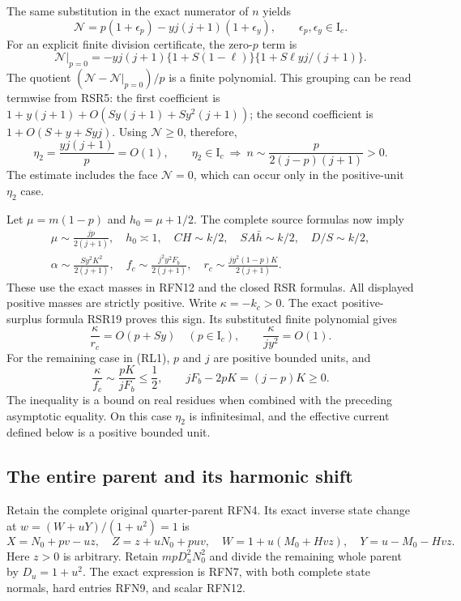 The same substitution in the exact numerator of \(n\) yields
\[
 \mathcal N=p(1+\epsilon_p)
                -yj(j+1)(1+\epsilon_y),\qquad
 \epsilon_p,\epsilon_y\in\mathrm I_c.                  \tag{RL5}
\]
For an explicit finite division certificate, the zero-\(p\) term is
\[
 \mathcal N|_{p=0}
 =-yj(j+1)\{1+S(1-\ell)\}
             \{1+S\ell yj/(j+1)\}.
\]
The quotient \((\mathcal N-\mathcal N|_{p=0})/p\) is a
finite polynomial.  This grouping can be read termwise from RSR5:
the first
coefficient is \(1+y(j+1)+O(Sy(j+1)+Sy^2(j+1))\);
the second coefficient is \(1+O(S+y+Syj)\).
Using \(\mathcal N\geq0\), therefore,
\[
 \eta_2=\frac{yj(j+1)}p=O(1),\qquad
 \eta_2\in\mathrm I_c\ \Longrightarrow\
 n\sim\frac{p}{2(j-p)(j+1)}>0 .                        \tag{RL6}
\]
The estimate includes the face \(\mathcal N=0\), which can occur
only in the positive-unit \(\eta_2\) case.

Let \(\mu=m(1-p)\) and \(h_0=\mu+1/2\).
The complete source formulas now imply
\[
\begin{gathered}
 \mu\sim\frac{jp}{2(j+1)},\quad h_0\asymp1,\quad
 CH\sim k/2,\quad SA\bar h\sim k/2,\quad D/S\sim k/2,\\
 \alpha\sim\frac{Sy^2K^2}{2(j+1)},\quad
 f_c\sim\frac{j^2y^2F_b}{2(j+1)},\quad
 r_c\sim\frac{jy^2(1-p)K}{2(j+1)} .
\end{gathered}                                                   \tag{RL7}
\]
These use the exact masses in RFN12 and the closed RSR formulas.
All displayed positive masses are strictly positive.
Write \(\kappa=-k_c>0\).  The exact positive-surplus formula
RSR19 proves this sign.  Its substituted finite polynomial gives
\[
 \frac{\kappa}{r_c}=O(p+Sy)\quad(p\in\mathrm I_c),\qquad
 \frac{\kappa}{jy^2}=O(1).                              \tag{RL8}
\]
For the remaining case in (RL1), \(p\) and \(j\) are positive
bounded units, and
\[
 \frac{\kappa}{f_c}\sim\frac{pK}{jF_b}\leq\frac12,
 \qquad jF_b-2pK=(j-p)K\geq0.                          \tag{RL9}
\]
The inequality is a bound on real residues when combined with
the preceding asymptotic equality.  On this case \(\eta_2\) is
infinitesimal, and the effective current defined below is a
positive bounded unit.

\subsection{The entire parent and its harmonic shift}

Retain the complete original quarter-parent RFN4.  Its exact inverse
state change at \(w=(W+uY)/(1+u^2)=1\) is
\[
 X=N_0+pv-uz,\quad Z=z+uN_0+puv,\quad
 W=1+u(M_0+Hvz),\quad Y=u-M_0-Hvz.                    \tag{RL10}
\]
Here \(z>0\) is arbitrary.  Retain \(mpD_u^2N_0^2\) and divide
the remaining whole parent by \(D_u=1+u^2\).
The exact expression is RFN7, with both complete state normals,
hard entries RFN9, and scalar RFN12.

